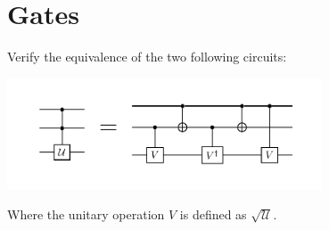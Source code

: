 \section{Gates}

{
    Verify the equivalence of the two following circuits:
    \begin{center}
        \includegraphics[width=0.7\textwidth]{Immagini/CCU.pdf}
    \end{center}
    Where the unitary operation $V$ is defined as $\sqrt{\mathcal{U}}$.
}
